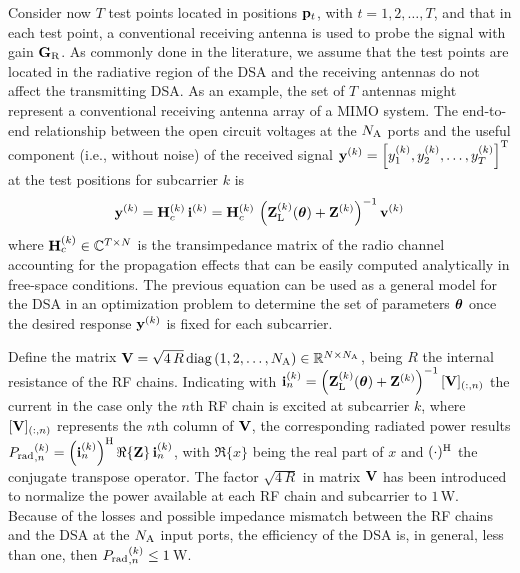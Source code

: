 \documentclass[10pt, final, twocolumn, twoside, romanappendices]{IEEEtran}
\begin{document}
Consider now $T$ test points located in positions ${\bf{p}}_t$, with $t=1,2, \ldots , T$, and that in each test point, a conventional receiving antenna is used to probe the signal with gain $\mathbf{G}_{\text{R}}$. 
As commonly done in the literature, we assume that the test points are located in the radiative region of the \ac{DSA} and the receiving antennas do not affect the transmitting \ac{DSA}. 
As an example, the set of $T$ antennas might represent a conventional receiving antenna array of a \ac{MIMO} system.  
%
The end-to-end relationship between the open circuit voltages at the $N_{\text{A}}$ ports and the useful component (i.e., without noise) of the received signal ${\bf{y}}^{(k)}=\left [y_1^{(k)},y_2^{(k)}, \ldots , y_T^{(k)} \right ]^{{\mathrm{T}}}$ at the test positions for subcarrier $k$  is 
%
\begin{align} \label{eq:by}
	{\bf{y}}^{(k)}={\bf{H}}_c^{(k)} \, {\bf{i}}^{(k)}={\bf{H}}_c^{(k)} \,   \left ( {\bf{Z}}_{\text{L}}^{(k)}(\boldsymbol{\theta})  +{\bf{Z}}^{(k)}  \right )^{-1} {\bf{v}}^{(k)}   
\end{align}
%
where ${\bf{H}}_c^{(k)} \in \mathbb{C}^{T \times N}$ is the transimpedance matrix of the radio channel accounting for the propagation effects that can be easily computed analytically in free-space conditions.
%
The previous equation can be used as a general model for the \ac{DSA} in an optimization problem to determine the set of parameters $\boldsymbol{\theta}$ once the desired response ${\bf{y}}^{(k)}$ is fixed for each subcarrier.

Define the matrix ${\bf{V}}=\sqrt{4\, R} \, {\rm diag} \left ( 1,2, \ldots , N_{\text{A}} \right )  \in \mathbb{R}^{N \times N_{\text{A}} }$, being $R$ the internal resistance of the \ac{RF} chains. Indicating with ${\bf{i}}_n^{(k)}=\left ( {\bf{Z}}_{\text{L}}^{(k)}(\boldsymbol{\theta})  +{\bf{Z}}^{(k)}  \right )^{-1} [{\bf{V}}]_{(:,n)}$ the current in the case only the $n$th \ac{RF} chain is excited at subcarrier $k$, where $[{\bf{V}}]_{(:,n)}$ represents the $n$th column of ${\bf{V}}$,  the corresponding radiated power results ${P_{\text{rad}}}_{,n}^{(k)}=\left ({{\bf{i}}_n^{(k)}}\right )^{{\mathrm{H}}} \Re\{{\bf{Z}}\} \, {\bf{i}}_n^{(k)} $, with $\Re\{x\}$ being the real part of $x$ and $(\cdot)^{{\mathrm{H}}}$ the conjugate transpose operator.  
The factor $\sqrt{4\, R}$ in matrix ${\bf{V}}$ has been introduced to normalize the power available at each \ac{RF} chain and subcarrier to $1\,$W.
Because of the losses and possible impedance mismatch between the \ac{RF} chains and the \ac{DSA} at the $N_{\text{A}}$ input ports, the efficiency of the \ac{DSA} is, in general, less than one, then ${P_{\text{rad}}}_{,n}^{(k)}\le 1\,$W.
\end{document}
